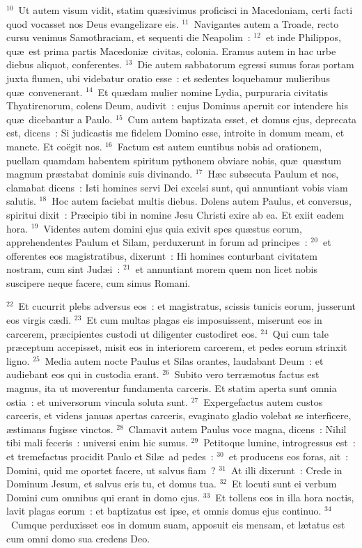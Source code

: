 ${}^{10}$~Ut autem visum vidit, statim qu\ae sivimus proficisci in Macedoniam, certi facti quod vocasset nos Deus evangelizare eis.
${}^{11}$~Navigantes autem a Troade, recto cursu venimus Samothraciam, et sequenti die Neapolim~:
${}^{12}$~et inde Philippos, qu\ae\ est prima partis Macedoni\ae\ civitas, colonia. Eramus autem in hac urbe diebus aliquot, conferentes.
${}^{13}$~Die autem sabbatorum egressi sumus foras portam juxta flumen, ubi videbatur oratio esse~: et sedentes loquebamur mulieribus qu\ae\ convenerant.
${}^{14}$~Et qu\ae dam mulier nomine Lydia, purpuraria civitatis Thyatirenorum, colens Deum, audivit~: cujus Dominus aperuit cor intendere his qu\ae\ dicebantur a Paulo.
${}^{15}$~Cum autem baptizata esset, et domus ejus, deprecata est, dicens~: Si judicastis me fidelem Domino esse, introite in domum meam, et manete. Et co\"egit nos.
${}^{16}$~Factum est autem euntibus nobis ad orationem, puellam quamdam habentem spiritum pythonem obviare nobis, qu\ae\ qu\ae stum magnum pr\ae stabat dominis suis divinando.
${}^{17}$~H\ae c subsecuta Paulum et nos, clamabat dicens~: Isti homines servi Dei excelsi sunt, qui annuntiant vobis viam salutis.
${}^{18}$~Hoc autem faciebat multis diebus. Dolens autem Paulus, et conversus, spiritui dixit~: Pr\ae cipio tibi in nomine Jesu Christi exire ab ea. Et exiit eadem hora.
${}^{19}$~Videntes autem domini ejus quia exivit spes qu\ae stus eorum, apprehendentes Paulum et Silam, perduxerunt in forum ad principes~:
${}^{20}$~et offerentes eos magistratibus, dixerunt~: Hi homines conturbant civitatem nostram, cum sint Jud\ae i~:
${}^{21}$~et annuntiant morem quem non licet nobis suscipere neque facere, cum simus Romani.


${}^{22}$~Et cucurrit plebs adversus eos~: et magistratus, scissis tunicis eorum, jusserunt eos virgis c\ae di.
${}^{23}$~Et cum multas plagas eis imposuissent, miserunt eos in carcerem, pr\ae cipientes custodi ut diligenter custodiret eos.
${}^{24}$~Qui cum tale pr\ae ceptum accepisset, misit eos in interiorem carcerem, et pedes eorum strinxit ligno.
${}^{25}$~Media autem nocte Paulus et Silas orantes, laudabant Deum~: et audiebant eos qui in custodia erant.
${}^{26}$~Subito vero terr\ae motus factus est magnus, ita ut moverentur fundamenta carceris. Et statim aperta sunt omnia ostia~: et universorum vincula soluta sunt.
${}^{27}$~Expergefactus autem custos carceris, et videns januas apertas carceris, evaginato gladio volebat se interficere, \ae stimans fugisse vinctos.
${}^{28}$~Clamavit autem Paulus voce magna, dicens~: Nihil tibi mali feceris~: universi enim hic sumus.
${}^{29}$~Petitoque lumine, introgressus est~: et tremefactus procidit Paulo et Sil\ae\ ad pedes~:
${}^{30}$~et producens eos foras, ait~: Domini, quid me oportet facere, ut salvus fiam~?
${}^{31}$~At illi dixerunt~: Crede in Dominum Jesum, et salvus eris tu, et domus tua.
${}^{32}$~Et locuti sunt ei verbum Domini cum omnibus qui erant in domo ejus.
${}^{33}$~Et tollens eos in illa hora noctis, lavit plagas eorum~: et baptizatus est ipse, et omnis domus ejus continuo.
${}^{34}$~Cumque perduxisset eos in domum suam, apposuit eis mensam, et l\ae tatus est cum omni domo sua credens Deo.



